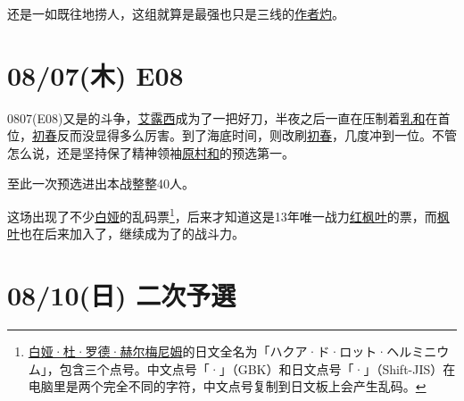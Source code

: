 还是一如既往地捞人，这组就算是最强也只是三线的\uline{作者灼}。

\section{08/07(木) E08}


0807(E08)又是的斗争，\uline{艾露西}成为了一把好刀，半夜之后一直在压制着\uline{乳和}在首位，\uline{初春}反而没显得多么厉害。到了海底时间，则改刷\uline{初春}，几度冲到一位。不管怎么说，还是坚持保了精神领袖\uline{原村和}的预选第一。

至此一次预选进出本战整整40人。

这场出现了不少\uline{白娅}的乱码票\footnote{\uline{白娅·杜·罗德·赫尔梅尼姆}的日文全名为「{\mincho ハクア·ド·ロット·ヘルミニウム}」，包含三个点号。中文点号「·」（GBK）和日文点号「{\mincho ·}」（Shift-JIS）在电脑里是两个完全不同的字符，中文点号复制到日文板上会产生乱码。}，后来才知道这是13年唯一战力\uline{红枫叶}的票，而\uline{枫叶}也在后来加入了，继续成为了的战斗力。

\clearpage

\section{08/10(日) 二次予選}

